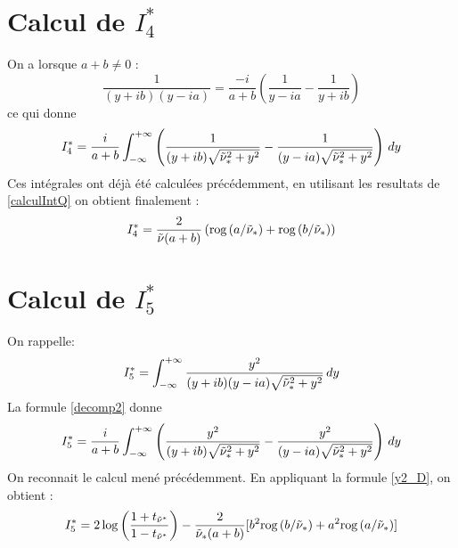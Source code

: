 \section{Calcul de $I_4^*$}
\label{calcI4}
On a lorsque $a+b\neq0$ :
\begin{equation}
    \frac{1}{(y+ib)(y-ia)}=\frac{-i}{a+b}\left( \frac{1}{y-ia}-\frac{1}{y+ib}\right)
    \label{decomp1}
\end{equation}
ce qui donne
\begin{equation*}
I_4^*=\frac{i}{a+b} \int_{-\infty}^{+\infty} \left(\frac{1}{(y+ib)\sqrt{\tilde{\nu}_*^2+y^2}}-\frac{1}{(y-ia)\sqrt{\tilde{\nu}_*^2+y^2}} \right)\,dy
\end{equation*}
Ces intégrales ont déjà été calculées précédemment, en utilisant les resultats de \ref{calculIntQ} on obtient finalement :
\begin{equation}
I_4^*=\frac{2}{\tilde{\nu}(a+b)}\left(\mbox{rog}\left(a/\tilde{\nu}_*\right)+\mbox{rog}\left(b/\tilde{\nu}_*\right) \right)
\label{valI4}
\end{equation}
\section{Calcul de $I_5^*$}
\label{calcI5}
On rappelle:
\begin{equation}
I_5^*=\int_{-\infty}^{+\infty} \frac{y^2}{(y+ib)(y-ia)\sqrt{\tilde{\nu}_*^2+y^2}}\,dy
\end{equation}
La formule \eqref{decomp2} donne 
$$ I_5^*=\frac{i}{a+b}\int_{-\infty}^{+\infty}\left( \frac{y^2}{(y+ib)\sqrt{\tilde{\nu}^2_*+y^2}}-\frac{y^2}{(y-ia)\sqrt{\tilde{\nu}_*^2+y^2}}\right)\,dy $$
On reconnait le calcul mené précédemment. En appliquant la formule \eqref{y2_D}, on obtient :
\begin{equation}
I_5^*=2\log\left(\frac{1+t_{\tilde{\nu}^*}}{1-t_{\tilde{\nu}^*}}\right)-\frac{2}{\tilde{\nu}_*(a+b)}\lbrack b^2\mbox{rog}\left(b/\tilde{\nu}_*\right)+a^2\mbox{rog}\left(a/\tilde{\nu}_*\right)\rbrack
\label{intI5}
\end{equation}